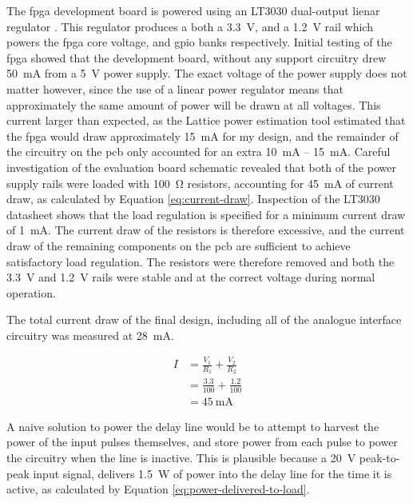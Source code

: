 The \gls{fpga} development board is powered using an LT3030 dual-output lienar regulator \cite{lattice2017b}. This regulator produces a both a \SI{3.3}{\volt}, and a \SI{1.2}{\volt} rail which powers the \gls{fpga} core voltage, and \gls{gpio} banks respectively. Initial testing of the \gls{fpga} showed that the development board, without any support circuitry drew \SI{50}{\milli\ampere} from a \SI{5}{\volt} power supply. The exact voltage of the power supply does not matter however, since the use of a linear power regulator means that approximately the same amount of power will be drawn at all voltages. This current larger than expected, as the Lattice power estimation tool estimated that the \gls{fpga} would draw approximately \SI{15}{\milli\ampere} for my design, and the remainder of the circuitry on the \gls{pcb} only accounted for an extra \SI{10}{\milli\ampere} -- \SI{15}{\milli\ampere}. Careful investigation of the evaluation board schematic revealed that both of the power supply rails were loaded with \SI{100}{\ohm} resistors, accounting for \SI{45}{\milli\ampere} of current draw, as calculated by Equation \ref{eq:current-draw}. Inspection of the LT3030 datasheet shows that the load regulation is specified for a minimum current draw of \SI{1}{\milli\ampere}. The current draw of the resistors is therefore excessive, and the current draw of the remaining components on the \gls{pcb} are sufficient to achieve satisfactory load regulation. The resistors were therefore removed and both the \SI{3.3}{\volt} and \SI{1.2}{\volt} rails were stable and at the correct voltage during normal operation.


\newcommand{\delayLineCurrentMa}{28}

The total current draw of the final design, including all of the analogue interface circuitry was measured at \SI{\delayLineCurrentMa}{\milli\ampere}.

\begin{align}
I &= \frac{V_1}{R_1} + \frac{V_2}{R_2} \nonumber \\
&= \frac{3.3}{100} + \frac{1.2}{100} \nonumber \\
&= \SI{45}{\milli\ampere} \label{eq:current-draw}
\end{align}


A naive solution to power the delay line would be to attempt to harvest the power of the input pulses themselves, and store power from each pulse to power the circuitry when the line is inactive. This is plausible because a \SI{20}{\volt} peak-to-peak input signal, delivers \SI{1.5}{\watt} of power into the delay line for the time it is active, as calculated by Equation \ref{eq:power-delivered-to-load}.

